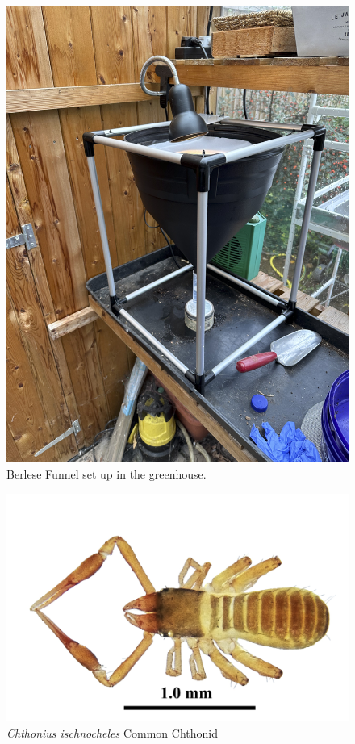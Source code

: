 \documentclass[
]{article}
\begin{document}
\newpage
\begin{figure}

{\centering \includegraphics[width=0.8\linewidth]{images/BerleseFunnel} 

}

\caption{Berlese Funnel set up in the greenhouse.}\label{fig:BerleseFunnel}
\end{figure}

\begin{figure}

{\centering \includegraphics[width=0.8\linewidth]{images/ChthoniusIschnocheles} 

}

\caption{ \textit{Chthonius ischnocheles} Common Chthonid  }\label{fig:ChthoniusIschnocheles}
\end{figure}
\end{document}
